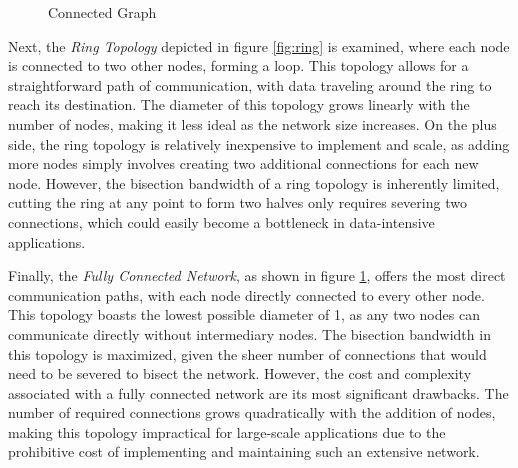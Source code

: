 \begin{figure}[!ht]
\begin{minipage}{0.3\textwidth}
{
    }
    \caption{Connected Graph}
    \label{fig:fully_connected}
  \end{minipage}
\end{figure}


Next, the \textit{Ring Topology} depicted in figure \ref{fig:ring} is examined, where each node is connected to two other nodes,
forming a loop. This topology allows for a straightforward path of communication, with data traveling around the ring to reach its destination.
The diameter of this topology grows linearly with the number of nodes, making it less ideal as the network size increases.
On the plus side, the ring topology is relatively inexpensive to implement and scale, as adding more nodes simply involves creating two additional connections for each new node.
However, the bisection bandwidth of a ring topology is inherently limited, cutting the ring at any point to form two halves only requires severing two connections,
which could easily become a bottleneck in data-intensive applications.

Finally, the \textit{Fully Connected Network}, as shown in figure \ref{fig:fully_connected}, offers the most direct communication paths, with each node directly connected to every other node.
This topology boasts the lowest possible diameter of 1, as any two nodes can communicate directly without intermediary nodes.
The bisection bandwidth in this topology is maximized, given the sheer number of connections that would need to be severed to bisect the network.
However, the cost and complexity associated with a fully connected network are its most significant drawbacks.
The number of required connections grows quadratically with the addition of nodes, making this topology impractical for large-scale applications due to the prohibitive cost of implementing and maintaining such an extensive network.


